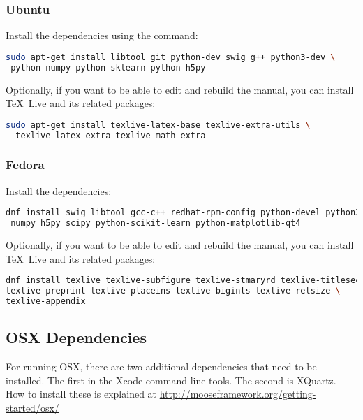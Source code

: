 \subsubsection{Ubuntu}

Install the dependencies using the command:

\begin{lstlisting}[language=bash]
sudo apt-get install libtool git python-dev swig g++ python3-dev \
 python-numpy python-sklearn python-h5py
\end{lstlisting}

Optionally, if you want to be able to edit and rebuild the manual, you can
install \TeX~Live and its related packages:
\begin{lstlisting}[language=bash]
sudo apt-get install texlive-latex-base texlive-extra-utils \
  texlive-latex-extra texlive-math-extra
\end{lstlisting}

\goToRavenInstallation

\subsubsection{Fedora}

Install the dependencies:

\begin{lstlisting}[language=bash]
dnf install swig libtool gcc-c++ redhat-rpm-config python-devel python3-devel \
 numpy h5py scipy python-scikit-learn python-matplotlib-qt4
\end{lstlisting}

Optionally, if you want to be able to edit and rebuild the manual, you can
install \TeX~Live and its related packages:
\begin{lstlisting}[language=bash]
dnf install texlive texlive-subfigure texlive-stmaryrd texlive-titlesec \
texlive-preprint texlive-placeins texlive-bigints texlive-relsize \
texlive-appendix
\end{lstlisting}

\goToRavenInstallation

\subsection{OSX Dependencies}
\label{osx_dependencies}

For running OSX, there are two additional dependencies that need to be
installed.  The first in the Xcode command line tools.  The second is
XQuartz.  How to install these is explained at
\url{http://mooseframework.org/getting-started/osx/}

